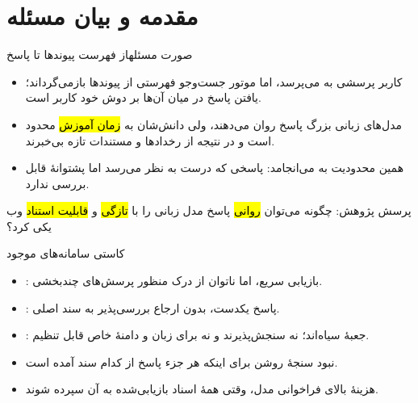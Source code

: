 \section{مقدمه و بیان مسئله}

\begin{frame}{صورت مسئله}{از فهرست پیوندها تا پاسخ}
  \begin{itemize}
    \item کاربر پرسشی به  می‌پرسد، اما موتور جست‌وجو فهرستی از
          پیوندها بازمی‌گرداند؛ یافتن پاسخ در میان آن‌ها بر دوش خود کاربر است.
    \item مدل‌های زبانی بزرگ پاسخ روان می‌دهند، ولی دانش‌شان به \hl{زمان آموزش}
          محدود است و در نتیجه از رخدادها و مستندات تازه بی‌خبرند.
    \item همین محدودیت به  می‌انجامد: پاسخی که درست به نظر می‌رسد
          اما پشتوانهٔ قابل بررسی ندارد.
  \end{itemize}

  \begin{PTcallout}
    پرسش پژوهش: چگونه می‌توان \hl{روانی} پاسخ مدل زبانی را با \hl{تازگی} و
    \hl{قابلیت استناد} وب یکی کرد؟
  \end{PTcallout}
\end{frame}

\begin{frame}{کاستی سامانه‌های موجود}
  \begin{itemize}
    \item {}: بازیابی سریع، اما ناتوان از درک منظور
          پرسش‌های چندبخشی.
    \item {}: پاسخ یکدست، بدون ارجاع بررسی‌پذیر
          به سند اصلی.
    \item {}: جعبهٔ سیاه‌اند؛ نه سنجش‌پذیرند و نه
          برای زبان و دامنهٔ خاص قابل تنظیم.
  \end{itemize}

  \begin{PTcons}
    \begin{itemize}
      \item نبود سنجهٔ روشن برای اینکه هر جزء پاسخ از کدام سند آمده است.
      \item هزینهٔ بالای فراخوانی مدل، وقتی همهٔ اسناد بازیابی‌شده به آن سپرده شوند.
    \end{itemize}
  \end{PTcons}
\end{frame}


